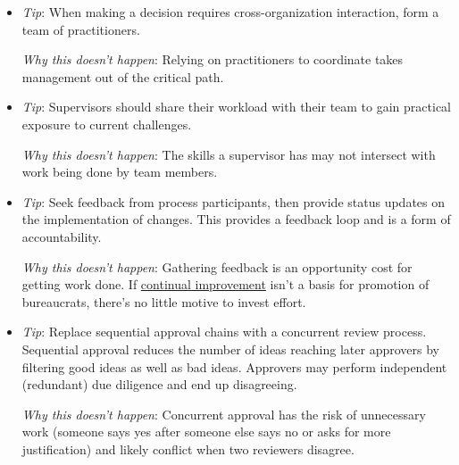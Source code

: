 \begin{itemize}
    \item \textit{Tip}: When making a decision requires cross-organization interaction, form a team of practitioners.

    \textit{Why this doesn't happen}: Relying on practitioners to coordinate takes management out of the critical path. 
    
    \item \textit{Tip}: Supervisors should share their workload with their team to gain practical exposure to current challenges.

    \textit{Why this doesn't happen}: The skills a supervisor has may not intersect with work being done by team members. 
    
    \item \textit{Tip}: Seek feedback from process participants, then provide status updates on the implementation of changes. This provides a feedback loop and is a form of accountability.

    \textit{Why this doesn't happen}: Gathering feedback is an opportunity cost for getting work done. If \href{https://en.wikipedia.org/wiki/Continual_improvement_process}{continual improvement}
    isn't a basis for promotion of bureaucrats, there's no little motive to invest effort.
    
    \item \textit{Tip}: Replace sequential approval chains with a concurrent review process. Sequential approval reduces the number of ideas reaching later approvers by filtering good ideas as well as bad ideas. Approvers may perform independent (redundant) due diligence and end up disagreeing. 
    
    \textit{Why this doesn't happen}: Concurrent approval has the risk of unnecessary work (someone says yes after someone else says no or asks for more justification) and likely conflict when two reviewers disagree. 
\end{itemize}

